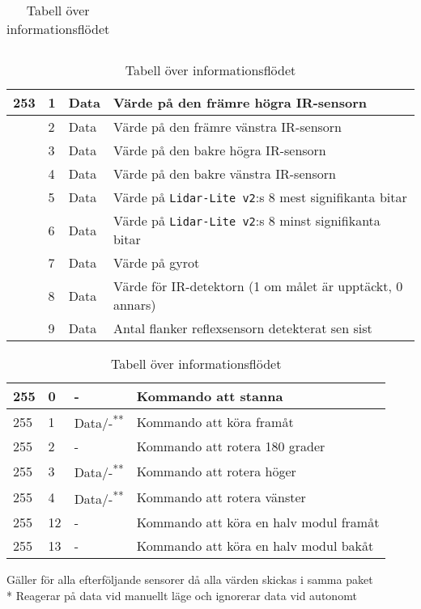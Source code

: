 \documentclass[11pt]{article}
\begin{document}
\begin{flushleft}
\begin{table}[h]
\begin{tabular}{|p{6em}|p{1em}|p{6em}|p{25em}|}
\end{tabular}

\begin{tabular}{|p{6em}|p{1em}|p{6em}|p{25em}|} \hline
253\text{*}  & 1 & Data & Värde på den främre högra IR-sensorn \\ \hline
 & 2 & Data & Värde på den främre vänstra IR-sensorn \\ \hline
 & 3 & Data & Värde på den bakre högra IR-sensorn \\ \hline
 & 4 & Data & Värde på den bakre vänstra IR-sensorn \\ \hline
 & 5 & Data &  Värde på \verb+Lidar-Lite v2+:s 8 mest signifikanta bitar \\ \hline
 & 6 & Data &  Värde på \verb+Lidar-Lite v2+:s 8 minst signifikanta bitar \\ \hline
 & 7 & Data & Värde på gyrot \\ \hline
 & 8 & Data & Värde för IR-detektorn (1 om målet är upptäckt, 0 annars) \\ \hline
 & 9 & Data & Antal flanker reflexsensorn detekterat sen sist\\ \hline
\end{tabular}

\begin{tabular}{|p{6em}|p{1em}|p{6em}|p{25em}|} \hline

255 & 0 & - & Kommando att stanna \\ \hline
255 & 1 & Data/-\textsuperscript{**}   & Kommando att köra framåt \\ \hline
255 & 2 & - & Kommando att rotera 180 grader\\ \hline
255 & 3 & Data/-\textsuperscript{**}    & Kommando att rotera höger \\ \hline
255 & 4 & Data/-\textsuperscript{**}    & Kommando att rotera vänster \\ \hline
255 & 12 & - & Kommando att köra en halv modul framåt\\ \hline
255 & 13 & - & Kommando att köra en halv modul bakåt \\ \hline
\end{tabular}

\text{*} Gäller för alla efterföljande sensorer då alla värden skickas i samma paket \\*
\text{**} Reagerar på data vid manuellt läge och ignorerar data vid autonomt

\caption{Tabell över informationsflödet} \label{tab}
\end{table}


\end{flushleft}
\end{document}
